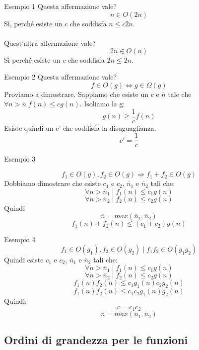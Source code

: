 \documentclass[a4paper]{article}
\begin{document}
\begin{examplebox}{Esempio 1}
Questa affermazione vale?
\[n \in O(2n)\]
Sì, perché esiste un $c$ che soddisfa $n \le c2n$.\\\\
Quest'altra affermazione vale?
\[2n \in O(n)\]
Sì perché esiste un $c$ che soddisfa $2n \le 2n$.
\end{examplebox}
\begin{examplebox}{Esempio 2}
Questa affermazione vale?
\[f \in O(g) \Longleftrightarrow g \in \Omega(g)\]
Proviamo a dimostrare. Sappiamo che esiste un $c$ e $\overline{n}$ tale che \(\forall n > \overline{n} \; f(n) \le cg(n)\). Isoliamo la g:
\[g(n) \ge \frac{1}{c} f(n)\]
Esiste quindi un c' che soddisfa la disuguaglianza. 
\[c' = \frac{1}{c}\]
\end{examplebox}
\begin{examplebox}{Esempio 3}

\[f_1 \in O(g), 
f_2 \in O(g) \Longrightarrow f_1 + f_2 \in O(g)
\]
Dobbiamo dimostrare che esiste $c_1$ e $c_2$, $\overline{n}_1$ e $\overline{n}_2$ tali che:
\[\forall n > \overline{n}_1 \; | \; f_1(n) \le c_1g(n)\]
\[\forall n > \overline{n}_2 \; | \; f_2(n) \le c_2g(n)\]
Quindi
\[\overline{n} = max(\overline{n}_1, \overline{n}_2)\]
\[f_1(n) + f_2(n) \le (c_1 + c_2)g(n)\]
    
\end{examplebox}

\begin{examplebox}{Esempio 4}
    \[f_1 \in O(g_1), f_2 \in O(g_2) \; | \; f_1f_2 \in O(g_1g_2)\]
Quindi esiste $c_1$ e $c_2$, $\overline{n}_1$ e $\overline{n}_2$ tali che:
\[\forall n > \overline{n}_1 \; | \; f_1(n) \le c_1g(n)\]
\[\forall n > \overline{n}_2 \; | \; f_2(n) \le c_2g(n)\]
\[f_1(n)f_2(n) \le c_1g_1(n)c_2g_2(n)\]
\[f_1(n)f_2(n) \le c_1c_2g_1(n)g_2(n)\]
Quindi:
 \[c = c_1c_2\] \[\overline{n} = max(\overline{n}_1, \overline{n}_2)\]
\end{examplebox}

\subsection{Ordini di grandezza per le funzioni}
\end{document}
